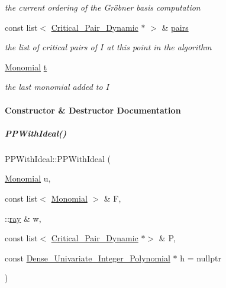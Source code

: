 \begin{DoxyCompactItemize}
\begin{DoxyCompactList}\small\item\em the current ordering of the Gr\"{o}bner basis computation \end{DoxyCompactList}\item 
\mbox{\label{group___g_b_computation_a95ee2432221feb207ae032a4e3946858}} 
const list$<$ \hyperlink{group___g_b_computation_class_critical___pair___dynamic}{Critical\+\_\+\+Pair\+\_\+\+Dynamic} $\ast$ $>$ \& \hyperlink{group___g_b_computation_a95ee2432221feb207ae032a4e3946858}{pairs}
\begin{DoxyCompactList}\small\item\em the list of critical pairs of $I$ at this point in the algorithm \end{DoxyCompactList}\item 
\mbox{\label{group___g_b_computation_a45e8e20417c6213edd71bc5ee6e2f6cd}} 
\hyperlink{group__polygroup_class_monomial}{Monomial} \hyperlink{group___g_b_computation_a45e8e20417c6213edd71bc5ee6e2f6cd}{t}
\begin{DoxyCompactList}\small\item\em the last monomial added to $I$ \end{DoxyCompactList}\end{DoxyCompactItemize}


\paragraph{Constructor \& Destructor Documentation}
\mbox{\label{group___g_b_computation_a4aaab17f2c6c03dfe1b6cc6bb2ca3f73}} 
\subparagraph{\texorpdfstring{P\+P\+With\+Ideal()}{PPWithIdeal()}}
{\footnotesize\ttfamily P\+P\+With\+Ideal\+::\+P\+P\+With\+Ideal (\begin{DoxyParamCaption}\item[{\hyperlink{group__polygroup_class_monomial}{Monomial}}]{u,  }\item[{const list$<$ \hyperlink{group__polygroup_class_monomial}{Monomial} $>$ \&}]{F,  }\item[{\+::\hyperlink{group___c_l_s_solvers_classray}{ray} \&}]{w,  }\item[{const list$<$ \hyperlink{group___g_b_computation_class_critical___pair___dynamic}{Critical\+\_\+\+Pair\+\_\+\+Dynamic} $\ast$$>$ \&}]{P,  }\item[{const \hyperlink{group__polygroup_class_dense___univariate___integer___polynomial}{Dense\+\_\+\+Univariate\+\_\+\+Integer\+\_\+\+Polynomial} $\ast$}]{h = {\ttfamily nullptr} }\end{DoxyParamCaption})\hspace{0.3cm}{\ttfamily [inline]}}



